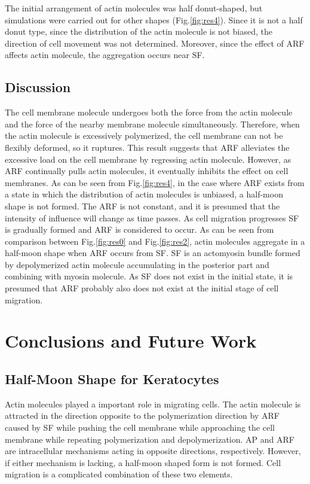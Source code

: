 \documentclass[a4paper,12pt]{book}
\begin{document}
The initial arrangement of actin molecules was half donut-shaped, but simulations were carried out for other shapes (Fig.\ref{fig:res4}). Since it is not a half donut type, since the distribution of the actin molecule is not biased, the direction of cell movement was not determined. Moreover, since the effect of ARF affects actin molecule, the aggregation occurs near SF.

\section{Discussion}
The cell membrane molecule undergoes both the force from the actin molecule and the force of the nearby membrane molecule simultaneously. Therefore, when the actin molecule is excessively polymerized, the cell membrane can not be flexibly deformed, so it ruptures. This result suggests that ARF alleviates the excessive load on the cell membrane by regressing actin molecule. However, as ARF continually pulls actin molecules, it eventually inhibits the effect on cell membranes. As can be seen from Fig.\ref{fig:res4}, in the case where ARF exists from a state in which the distribution of actin molecules is unbiased, a half-moon shape is not formed. The ARF is not constant, and it is presumed that the intensity of influence will change as time passes. As cell migration progresses SF is gradually formed and ARF is considered to occur. As can be seen from comparison between Fig.\ref{fig:res0} and Fig.\ref{fig:res2}, actin molecules aggregate in a half-moon shape when ARF occurs from SF. SF is an actomyosin bundle formed by depolymerized actin molecule accumulating in the posterior part and combining with myosin molecule. As SF does not exist in the initial state, it is presumed that ARF probably also does not exist at the initial stage of cell migration.

\chapter{Conclusions and Future Work}
\section{Half-Moon Shape for Keratocytes}
Actin molecules played a important role in migrating cells. The actin molecule is attracted in the direction opposite to the polymerization direction by ARF caused by SF while pushing the cell membrane while approaching the cell membrane while repeating polymerization and depolymerization. AP and ARF are intracellular mechanisms acting in opposite directions, respectively. However, if either mechanism is lacking, a half-moon shaped form is not formed. Cell migration is a complicated combination of these two elements.
\end{document}
